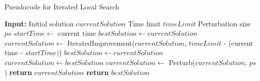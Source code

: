 \begin{algorithm}[!tb]
    \caption{Pseudocode for Iterated Local Search} \label{ils}
    \begin{algorithmic}[1]
        \State \textbf{Input:}
        \State \hspace{\algorithmicindent} Initial solution $currentSolution$
        \State \hspace{\algorithmicindent} Time limit $timeLimit$
        \State \hspace{\algorithmicindent} Perturbation size $ps$
        \State $startTime \gets$ current time 
        \State $bestSolution \gets currentSolution$ 
        \State $currentSolution \gets$ IteratedImprovement($currentSolution$,
        \Statex \hspace{\algorithmicindent} \hspace{\algorithmicindent}$timeLimit$ - (current time - $startTime)$)
            \State $bestSolution \gets currentSolution$ 
            \State $currentSolution \gets bestSolution$ 
        \EndIf
        \State $currentSolution \gets$ Perturb($currentSolution$, $ps$)
        \EndWhile
            \State \textbf{return} $currentSolution$
        \Else 
            \State \textbf{return} $bestSolution$
        \EndIf
    \end{algorithmic}
\end{algorithm}
